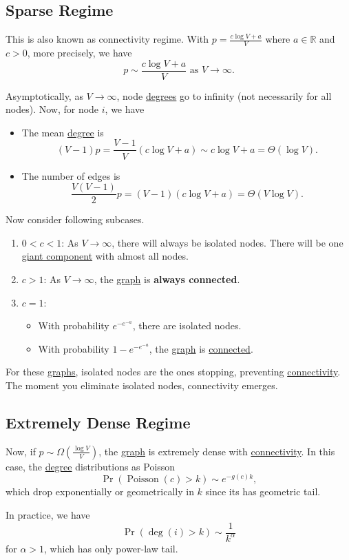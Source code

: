 \subsection{Sparse Regime}\label{subsec:sparse-regime}
This is also known as connectivity regime. With \(p = \frac{c\log V + a}{V}\) where \(a\in\mathbb{R}\) and \(c>0\), more precisely, we have
\[
	p\sim \frac{c\log V + a}{V} \text{ as }V\to \infty.
\]

Asymptotically, as \(V\to \infty \), node \hyperref[def:degree]{degrees} go to infinity (not necessarily for all nodes). Now, for node \(i\), we have
\begin{itemize}
	\item The mean \hyperref[def:degree]{degree} is
	      \[
		      (V - 1)p = \frac{V-1}{V}(c\log V + a)\sim c\log V + a = \Theta(\log V).
	      \]
	\item The number of edges is
	      \[
		      \frac{V(V-1)}{2}p = (V - 1)(c\log V + a) = \Theta(V\log V).
	      \]
\end{itemize}

\begin{remark}
	Now consider following subcases.
	\begin{enumerate}
		\item \(0<c<1\): As \(V\to \infty \), there will always be isolated nodes. There will be one \hyperref[def:giant-component]{giant component} with almost all nodes.
		\item \(c>1\): As \(V\to \infty \), the \hyperref[def:graph]{graph} is \textbf{always connected}.
		\item \(c = 1\):
		      \begin{itemize}
			      \item With probability \(e^{-e^{-a}}\), there are isolated nodes.
			      \item With probability \(1 - e^{-e^{-a}}\), the \hyperref[def:graph]{graph} is \hyperref[def:connected]{connected}.
		      \end{itemize}
	\end{enumerate}
	For these \hyperref[def:graph]{graphs}, isolated nodes are the ones stopping, preventing \hyperref[def:connected]{connectivity}. The moment you eliminate isolated nodes, connectivity emerges.
\end{remark}

\subsection{Extremely Dense Regime}\label{subsec:extremely-dense-regime}
Now, if \(p\sim \Omega(\frac{\log V}{V})\), the \hyperref[def:graph]{graph} is extremely dense with \hyperref[def:connected]{connectivity}. In this case, the \hyperref[def:degree]{degree} distributions as Poisson
\[
	\Pr(\operatorname{Poisson}(c) > k) \sim e^{-g(c)k},
\]
which drop exponentially or geometrically in \(k\) since its has geometric tail.
\begin{remark}
	In practice, we have
	\[
		\Pr(\deg(i) > k) \sim \frac{1}{k^\alpha }
	\]
	for \(\alpha > 1\), which has only power-law tail.
\end{remark}